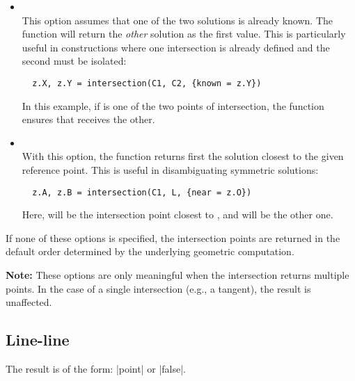 \begin{itemize}
  \item {}  \\
  This option assumes that one of the two solutions is already known. The function will return the \emph{other} solution as the first value. This is particularly useful in constructions where one intersection is already defined and the second must be isolated:
  \begin{mybox}
  \begin{verbatim}
  z.X, z.Y = intersection(C1, C2, {known = z.Y})
  \end{verbatim}
  \end{mybox}
  In this example, if  is one of the two points of intersection, the function ensures that  receives the other.

  \item {}  \\
  With this option, the function returns first the solution closest to the given reference point. This is useful in disambiguating symmetric solutions:
  \begin{mybox}
  \begin{verbatim}
  z.A, z.B = intersection(C1, L, {near = z.O})
  \end{verbatim}
  \end{mybox}
  Here,  will be the intersection point closest to , and  will be the other one.
\end{itemize}

If none of these options is specified, the intersection points are returned in the default order determined by the underlying geometric computation.

\medskip
\noindent
\textbf{Note:} These options are only meaningful when the intersection returns multiple points. In the case of a single intersection (e.g., a tangent), the result is unaffected.



\subsection{Line-line} %
\label{sub:line_line}

The result is of the form: |point| or |false|.


